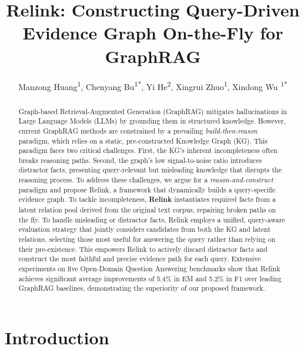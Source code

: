 \documentclass[letterpaper]{article} %
\title{
Relink: Constructing Query-Driven Evidence Graph On-the-Fly for GraphRAG
}
\author {
    Manzong Huang\textsuperscript{\rm 1},
    Chenyang Bu\textsuperscript{\rm 1*},
    Yi He\textsuperscript{\rm 2},
    Xingrui Zhuo\textsuperscript{\rm 1},
    Xindong Wu \textsuperscript{\rm 1*}
}
\begin{document}
\maketitle

\begin{abstract}

Graph-based Retrieval-Augmented Generation (GraphRAG) mitigates hallucinations in Large Language Models (LLMs) by grounding them in structured knowledge. However, current GraphRAG methods are constrained by a prevailing \textit{build-then-reason} paradigm, which relies on a static, pre-constructed Knowledge Graph (KG). This paradigm faces two critical challenges. First, the KG's inherent incompleteness often breaks reasoning paths. Second, the graph’s low signal-to-noise ratio introduces distractor facts, presenting query-relevant but misleading knowledge that disrupts the reasoning process.
%
To address these challenges, we argue for a \textit{reason-and-construct} paradigm and propose Relink, a framework that dynamically builds a query-specific evidence graph. To tackle incompleteness, \textbf{Relink} instantiates required facts from a latent relation pool derived from the original text corpus, repairing broken paths on the fly. To handle misleading or distractor facts, Relink employs a unified, query-aware evaluation strategy that jointly considers candidates from both the KG and latent relations, selecting those most useful for answering the query rather than relying on their pre-existence. This empowers Relink to actively discard distractor facts and construct the most faithful and precise evidence path for each query.
%
Extensive experiments on five Open-Domain Question Answering benchmarks show that Relink achieves significant average improvements of 5.4\% in EM and 5.2\% in F1 over leading GraphRAG baselines, demonstrating the superiority of our proposed framework. 

\end{abstract}

\begin{links}
\end{links}

\section{Introduction}
\end{document}
